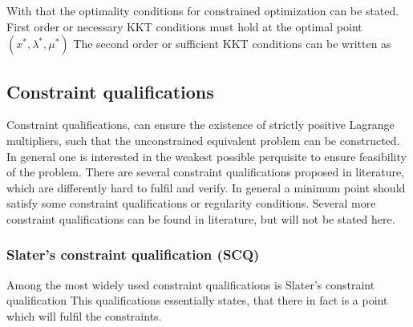     With that the optimality conditions for constrained optimization can be stated.
    First order or necessary KKT conditions must hold at the optimal point $(x^{\ast}, \lambda^{\ast}, \mu^{\ast})$
    The second order or sufficient KKT conditions can be written as

    \subsection{Constraint qualifications}
    \label{sec:opt:theory:cq}

    Constraint qualifications, can ensure the existence of strictly positive Lagrange
    multipliers, such that the unconstrained equivalent problem can be constructed. In general one is interested
    in the weakest possible perquisite to ensure feasibility  of the problem.
    There are several constraint qualifications proposed in literature, which are differently hard to fulfil
    and verify. In general a minimum point should satisfy some constraint qualifications or regularity conditions.
    Several more constraint qualifications can be found in literature, but will not be stated here.

    \subsubsection{Slater's constraint qualification (SCQ)}
    Among the most widely used constraint qualifications is Slater's constraint qualification
    This qualifications essentially states, that there in fact is a point which will fulfil the constraints.

